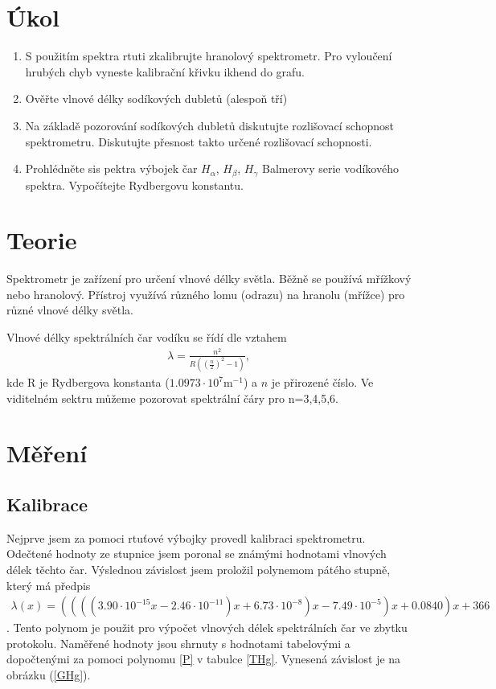 \documentclass[a4paper,12pt]{article}
\begin{document}
\section{Úkol}
\begin{enumerate}
\item S použitím spektra rtuti zkalibrujte hranolový spektrometr. Pro vyloučení hrubých chyb vyneste kalibrační křivku ikhend do grafu.
\item Ověřte vlnové délky sodíkových dubletů (alespoň tří)
\item Na základě pozorování sodíkových dubletů diskutujte rozlišovací schopnost spektrometru. Diskutujte přesnost takto určené rozlišovací schopnosti.
\item Prohlédněte sis pektra výbojek čar $H_\alpha$, $H_\beta$, $H_\gamma$ Balmerovy serie vodíkového spektra. Vypočítejte Rydbergovu konstantu.
\end{enumerate}

\section{Teorie}
Spektrometr je zařízení pro určení vlnové délky světla. Běžně se používá mřížkový nebo hranolový. Přístroj využívá různého lomu (odrazu) na hranolu (mřížce) pro různé vlnové délky světla.

Vlnové délky spektrálních čar vodíku se řídí dle \cite{text} vztahem
\begin{eqnarray}
\lambda = \frac{n^2}{R\left(\left(\frac{n}{2}\right)^2-1\right) },
\label{Ry}
\end{eqnarray}
kde R je Rydbergova konstanta ($1.0973 \cdot 10^7 \mbox{m}^{-1} $) a $n$ je přirozené číslo. Ve viditelném sektru můžeme pozorovat spektrální čáry pro n=3,4,5,6.

\section{Měření}
\subsection{Kalibrace}
Nejprve jsem za pomoci rtuťové výbojky provedl kalibraci spektrometru. Odečtené hodnoty ze stupnice jsem poronal se známými hodnotami vlnových délek těchto čar. Výslednou závislost jsem proložil polynemom pátého stupně, který má předpis
\begin{eqnarray}
\lambda(x)=((((3.90\cdot 10^{-15}x-2.46\cdot 10^{-11})x+ 6.73\cdot 10^{-8})x-7.49\cdot 10^{-5})x+0.0840)x+366
\label{P}
\end{eqnarray}.
Tento polynom je použit pro výpočet vlnových délek spektrálních čar ve zbytku protokolu.
Naměřené hodnoty jsou shrnuty s hodnotami tabelovými a dopočtenými za pomoci polynomu \ref{P} v tabulce \ref{THg}. Vynesená závislost je na obrázku (\ref{GHg}).
\end{document}
